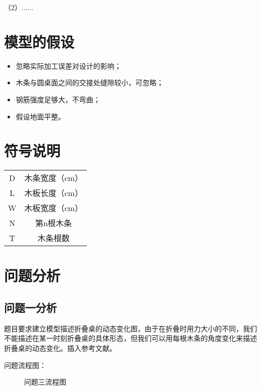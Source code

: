 \documentclass{whutmod}
\begin{document}
\begin{spacing}{1.0}
（2）......


\section{模型的假设}

\begin{itemize}
	\item 忽略实际加工误差对设计的影响；
	\item 木条与圆桌面之间的交接处缝隙较小，可忽略；
	\item 钢筋强度足够大，不弯曲；
	\item 假设地面平整。
\end{itemize}

\section{符号说明}
\begin{center}
	\begin{tabular}{cc}
		\hline
		\makebox[0.3\textwidth][c]{符号}	&  \makebox[0.4\textwidth][c]{意义} \\ \hline
		D	    & 木条宽度（cm） \\ \hline
		L	    & 木板长度（cm）  \\ \hline
		W	    & 木板宽度（cm）  \\ \hline
		N	    & 第n根木条  \\ \hline
		T	    & 木条根数  \\ \hline
	\end{tabular}
\end{center}

\section{问题分析}

\subsection{问题一分析}
题目要求建立模型描述折叠桌的动态变化图，由于在折叠时用力大小的不同，我们不能描述在某一时刻折叠桌的具体形态，但我们可以用每根木条的角度变化来描述折叠桌的动态变化。插入参考文献\cite{bib:one}。

问题流程图：
\begin{figure}[!h]
	\caption{问题三流程图}
\end{figure}


\end{spacing}
\end{document}

